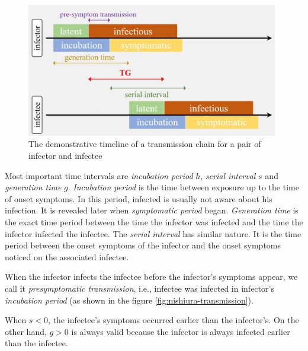 \documentclass[
  digital, %
  oneside, %
  lof,     %
  lot,     %
]{fithesis4}
\begin{document}
\begin{figure}[H]
  \begin{center}
    \includegraphics[width=11cm]{static/images/zhao2020_terms.png}
  \end{center}
  \caption{The demonstrative timeline of a transmission chain for a pair of infector and infectee \cite{zhao2020}}
  \label{fig:zhao-transmissive-chain-example}
\end{figure}

Most important time intervals are 
\textit{incubation period} $h$, \textit{serial interval} $s$ and \textit{generation time} $g$.
\textit{Incubation period} is the time between exposure up to the time of onset symptoms. In this period, infected is usually not aware about his infection.
It is revealed later when \textit{symptomatic period} began.
\textit{Generation time} is the exact time period between the time
the infector was infected and the time the infector infected the infectee.
The \textit{serial interval} has similar nature. It is 
the time period between the onset symptoms of the infector 
and the onset symptoms noticed on the associated infectee.

When the infector infects the infectee before the infector's
symptoms appear, we call it \textit{presymptomatic transmission}, i.e.,
infectee was infected in infector's \textit{incubation period}
(as shown in the figure \ref{fig:nishiura-transmission}).

When $s < 0$, the infectee's symptoms occurred earlier than the infector's.
On the other hand, $g > 0$ is always
valid because the infector is always infected earlier than the infectee.
\end{document}
